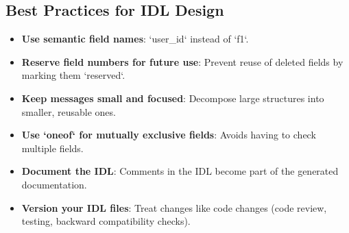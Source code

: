\documentclass[a4paper]{article}
\begin{document}
\subsection{Best Practices for IDL Design}
\begin{itemize}
    \item \textbf{Use semantic field names}: `user\_id` instead of `f1`.
    \item \textbf{Reserve field numbers for future use}: Prevent reuse of deleted fields by marking them `reserved`.
    \item \textbf{Keep messages small and focused}: Decompose large structures into smaller, reusable ones.
    \item \textbf{Use `oneof` for mutually exclusive fields}: Avoids having to check multiple fields.
    \item \textbf{Document the IDL}: Comments in the IDL become part of the generated documentation.
    \item \textbf{Version your IDL files}: Treat changes like code changes (code review, testing, backward compatibility checks).
\end{itemize}
\end{document}
